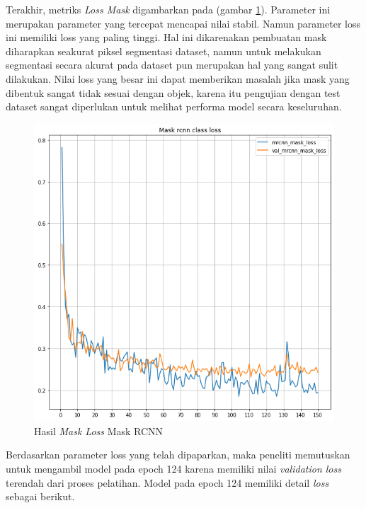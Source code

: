 Terakhir, metriks \textit{Loss Mask} digambarkan pada (gambar \ref{fig: Mask Loss Mask RCNN}).
Parameter ini merupakan parameter yang tercepat mencapai nilai stabil. Namun parameter loss ini memiliki
loss yang paling tinggi. Hal ini dikarenakan pembuatan mask diharapkan seakurat piksel segmentasi dataset,
namun untuk melakukan segmentasi secara akurat pada dataset pun merupakan hal yang sangat sulit dilakukan.
Nilai loss yang besar ini dapat memberikan masalah jika mask yang dibentuk sangat tidak sesuai dengan objek,
karena itu pengujian dengan test dataset sangat diperlukan untuk melihat performa model secara keseluruhan.

\begin{figure}[h!]
  \begin{center}
    \includegraphics[width= 0.55\linewidth]{bab4/3. MRCNN_Mask_Loss.png}
    \caption{Hasil \textit{Mask Loss} Mask RCNN}
    \label{fig: Mask Loss Mask RCNN}
  \end{center}
\end{figure}

Berdasarkan parameter loss yang telah dipaparkan, maka peneliti memutuskan untuk mengambil model pada
epoch 124 karena memiliki nilai \textit{validation loss} terendah dari proses pelatihan. Model
pada epoch 124 memiliki detail \textit{loss} sebagai berikut.

